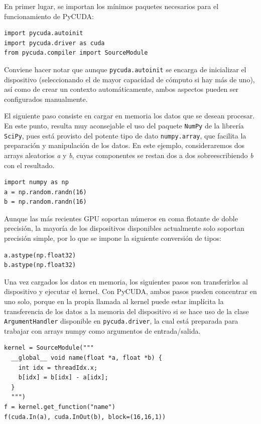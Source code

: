 \documentclass[twocolumn,twoside]{Jornadas}
\begin{document}
En primer lugar, se importan los mínimos paquetes necesarios para el funcionamiento de PyCUDA:

\begin{verbatim}
import pycuda.autoinit
import pycuda.driver as cuda
from pycuda.compiler import SourceModule
\end{verbatim}

Conviene hacer notar que aunque {\tt pycuda.autoinit} se encarga de inicializar el dispositivo (seleccionando el de mayor capacidad de cómputo si hay más de uno), así como de crear un contexto automáticamente, ambos aspectos pueden ser configurados manualmente.

El siguiente paso consiste en cargar en memoria los datos que se desean procesar. En este punto, resulta muy aconsejable el uso del paquete {\tt NumPy} de la librería {\tt SciPy}, pues está provisto del potente tipo de dato {\tt numpy.array}, que facilita la preparación y manipulación de los datos. En este ejemplo, consideraremos dos arrays aleatorios \emph{a} y \emph{b}, cuyas componentes se restan dos a dos sobreescribiendo \emph{b} con el resultado.

\begin{verbatim}
import numpy as np
a = np.random.randn(16)
b = np.random.randn(16)
\end{verbatim}

Aunque las más recientes GPU soportan números en coma flotante de doble precisión, la mayoría de los dispositivos disponibles actualmente solo soportan precisión simple, por lo que se impone la siguiente conversión de tipos:

\begin{verbatim}
a.astype(np.float32)
b.astype(np.float32)
\end{verbatim}

Una vez cargados los datos en memoria, los siguientes pasos son transferirlos al dispositivo y ejecutar el kernel. Con PyCUDA, ambos pasos pueden concentrar en uno solo, porque en la propia llamada al kernel puede estar implícita la transferencia de los datos a la memoria del dispositivo si se hace uso de la clase {\tt ArgumentHandler} disponible en {\tt pycuda.driver}, la cual está preparada para trabajar con arrays numpy como argumentos de entrada/salida.

\begin{verbatim}
kernel = SourceModule("""
  __global__ void name(float *a, float *b) {
    int idx = threadIdx.x;
    b[idx] = b[idx] - a[idx];
  }
  """)
f = kernel.get_function("name")
f(cuda.In(a), cuda.InOut(b), block=(16,16,1))
\end{verbatim}
\end{document}
